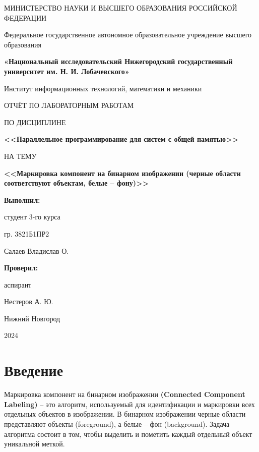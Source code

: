 \documentclass[a4paper, 14pt]{article}
\newcommand{\n}{\par}
\begin{document}
	\thispagestyle{empty}
	\begin{center}

		МИНИСТЕРСТВО НАУКИ И ВЫСШЕГО ОБРАЗОВАНИЯ РОССИЙСКОЙ ФЕДЕРАЦИИ\n
		Федеральное государственное автономное образовательное учреждение высшего образования\n
		\textbf{«Национальный исследовательский Нижегородский государственный университет им. Н. И. Лобачевского»}\n
		Институт информационных технологий, математики и механики
		\vspace{1cm}

		ОТЧЁТ ПО ЛАБОРАТОРНЫМ РАБОТАМ

		ПО ДИСЦИПЛИНЕ

		\textbf{<<Параллельное программирование для систем с общей памятью>>}

		НА ТЕМУ

		\textbf{<<Маркировка компонент на бинарном изображении (черные области соответствуют объектам, белые – фону)>>}
	\end{center}
	\vspace{0.3cm}
	\begin{flushright}

		\textbf{Выполнил:}

		студент 3-го курса 

		гр. 3821Б1ПР2

		Салаев Владислав О.
	\end{flushright}

	\begin{flushright}
		\textbf{Проверил:}

		аспирант

		Нестеров А. Ю.
	\end{flushright}

	\begin{center}
		\vfill
		Нижний Новгород

		2024
	\end{center}
	\newpage
	\begin{center}\tableofcontents\end{center}
	\newpage
	\section*{\centering \textbf{Введение}}

        Маркировка компонент на бинарном изображении \textbf{(Connected Component Labeling)} – это алгоритм, используемый для идентификации и маркировки всех отдельных объектов в изображении. В бинарном изображении черные области представляют объекты (foreground), а белые – фон (background). Задача алгоритма состоит в том, чтобы выделить и пометить каждый отдельный объект уникальной меткой.
        
\end{document}
